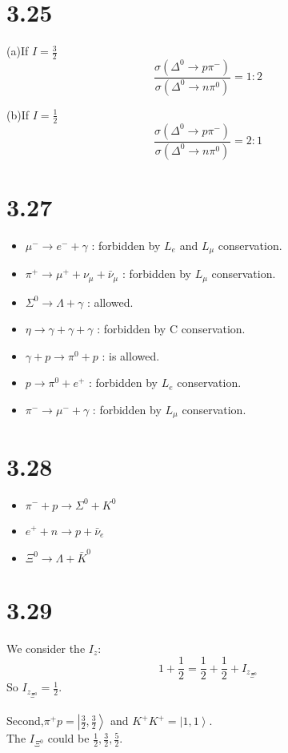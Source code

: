 \documentclass{article}
\begin{document}
\begin{CJK*}{GBK}{song}
\section{3.25}
(a)If $I=\frac{3}{2}$
\begin{equation}
\frac{\sigma(\Delta^0\rightarrow p\pi^-)}{\sigma(\Delta^0\rightarrow n\pi^0)}=1:2
\end{equation}

(b)If $I=\frac{1}{2}$
\begin{equation}
\frac{\sigma(\Delta^0\rightarrow p\pi^-)}{\sigma(\Delta^0\rightarrow n\pi^0)}=2:1
\end{equation}







\section{3.27}
\begin{itemize}
\item $\mu^-\rightarrow e^-+\gamma$  :  forbidden by $L_e$ and $L_{\mu}$ conservation.
\item $\pi^+\rightarrow \mu^++\nu_{\mu}+\bar{\nu}_{\mu}$  :  forbidden by $L_{\mu}$ conservation.
\item $\Sigma^0\rightarrow \Lambda+\gamma$  :  allowed.
\item $\eta\rightarrow \gamma+\gamma+\gamma$  :  forbidden by C conservation.
\item $\gamma+p\rightarrow\pi^0+p$  :  is allowed.
\item $p\rightarrow\pi^0+e^+$  :  forbidden by $L_e$ conservation.
\item $\pi^-\rightarrow\mu^-+\gamma$  :  forbidden by $L_{\mu}$ conservation.
\end{itemize}


\section{3.28}
\begin{itemize}
\item $\pi^-+p\rightarrow \Sigma^0+K^0$
\item $e^++n\rightarrow p+\bar{\nu}_e$
\item $\Xi^0\rightarrow \Lambda+\bar{K}^0$
\end{itemize}

\section{3.29}
We consider the $I_z$:
\begin{equation}
1+\frac{1}{2}=\frac{1}{2}+\frac{1}{2}+I_{z_{\Xi^0}}
\end{equation}
So $I_{z_{\Xi^0}}=\frac{1}{2}$.\\\\
Second,$\pi^+p=\left|\frac{3}{2},\frac{3}{2}\right\rangle$ and $K^+K^+=\left|1,1\right\rangle$.\\
The $I_{\Xi^0}$ could be $\frac{1}{2}, \frac{3}{2}, \frac{5}{2}$.



\end{CJK*}
\end{document}
